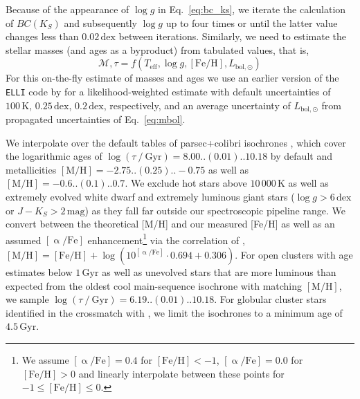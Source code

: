 \documentclass[
  journal=pasa,
  manuscript=research-paper, %
  year=2024,
  volume=37
]{cup-journal}
\begin{document}
Because of the appearance of $\log g$ in Eq.~\ref{eq:bc_ks}, we iterate the calculation of $BC(K_S)$ and subsequently $\log g$ up to four times or until the latter value changes less than $0.02\,\mathrm{dex}$ between iterations. Similarly, we need to estimate the stellar masses (and ages as a byproduct) from tabulated values, that is,
\begin{equation}
\mathcal{M}, \tau = f(T_\mathrm{eff}, \log g, \mathrm{[Fe/H]}, L_\mathrm{bol,\odot})
\label{eq:mass_age}
\end{equation}
For this on-the-fly estimate of masses and ages we use an earlier version of the \texttt{ELLI} code by \cite{Lin2018} for a likelihood-weighted estimate with default uncertainties of $100\,\mathrm{K}$, $0.25\,\mathrm{dex}$, $0.2\,\mathrm{dex}$, respectively, and an average uncertainty of $L_\mathrm{bol,\odot}$ from propagated uncertainties of Eq.~\ref{eq:mbol}.

We interpolate over the default tables of {\sc parsec+colibri} isochrones \citep{Bressan2012, Marigo2017}, which cover the logarithmic ages of $\log (\tau~/~\mathrm{Gyr}) = 8.00..(0.01)..10.18$ by default and metallicities $\mathrm{[M/H]} = -2.75..(0.25)..-0.75$ as well as $\mathrm{[M/H]} = -0.6..(0.1)..0.7$. We exclude hot stars above $10\,000\,\mathrm{K}$ as well as extremely evolved white dwarf and extremely luminous giant stars ($\log g > 6\,\mathrm{dex}$ or $J - K_S > 2\,\mathrm{mag}$) as they fall far outside our spectroscopic pipeline range. We convert between the theoretical [M/H] and our measured [Fe/H] as well as an assumed $\mathrm{[\upalpha/Fe]}$ enhancement\footnote{We assume $\mathrm{[\upalpha/Fe]} = 0.4$ for $\mathrm{[Fe/H]} < -1$, $\mathrm{[\upalpha/Fe]} = 0.0$ for $\mathrm{[Fe/H]} > 0$ and linearly interpolate between these points for $-1 \leq \mathrm{[Fe/H]} \leq 0$.} via the correlation of \citet{Salaris2006}, $\mathrm{[M/H]} = \mathrm{[Fe/H]} + \log\left(10^{\mathrm{[\upalpha/Fe]}} \cdot 0.694 + 0.306 \right)$. For open clusters with age estimates below $1\,\mathrm{Gyr}$ as well as unevolved stars that are more luminous than expected from the oldest cool main-sequence isochrone with matching $\mathrm{[M/H]}$, we sample $\log (\tau~/~\mathrm{Gyr}) = 6.19..(0.01)..10.18$. For globular cluster stars identified in the crossmatch with \citet{Baumgardt2021}, we limit the isochrones to a minimum age of $4.5\,\mathrm{Gyr}$.
\end{document}
